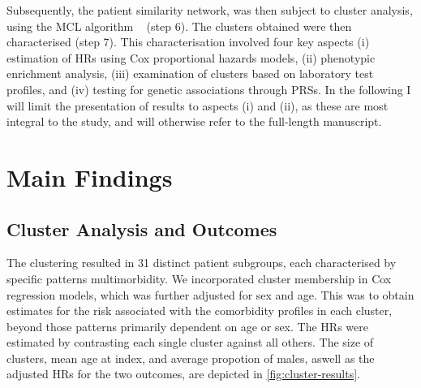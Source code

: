 Subsequently,
the patient similarity network,
was then subject to cluster analysis,
using the \ac{MCL} algorithm 
~\autocite{vandongenGraph2008}
(step 6). 
The clusters obtained were then characterised (step 7).
This characterisation involved four key aspects 
(i) estimation of \acp{HR} using Cox proportional hazards models,
(ii) phenotypic enrichment analysis, 
(iii) examination of clusters based on laboratory test profiles,
and (iv) testing for genetic associations through \acp{PRS}.
In the following I will limit the presentation
of results to aspects (i) and (ii), 
as these are most integral to the study,
and will otherwise refer to the full-length manuscript.

\section{Main Findings}

% 

\subsection{Cluster Analysis and Outcomes}


The clustering resulted in 31 distinct patient subgroups, 
each characterised by specific patterns multimorbidity.
We incorporated cluster membership in Cox regression models, 
which was further adjusted for sex and age. 
This was to obtain estimates for the risk associated with the comorbidity
profiles in each cluster, beyond those patterns primarily dependent on
age or sex.
The \acp{HR} were estimated 
by contrasting each single cluster against all others.
The size of clusters, mean age at index, and average propotion of males, 
aswell as the adjusted \acp{HR} for the two outcomes, are
depicted in \cref{fig:cluster-results}.

